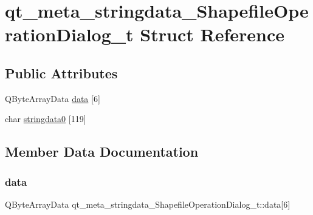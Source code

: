\hypertarget{structqt__meta__stringdata___shapefile_operation_dialog__t}{}\section{qt\+\_\+meta\+\_\+stringdata\+\_\+\+Shapefile\+Operation\+Dialog\+\_\+t Struct Reference}
\label{structqt__meta__stringdata___shapefile_operation_dialog__t}
\subsection*{Public Attributes}
\begin{DoxyCompactItemize}
\item 
Q\+Byte\+Array\+Data \mbox{\hyperlink{structqt__meta__stringdata___shapefile_operation_dialog__t_ac8173565c23693b6429f5c291fefda54}{data}} \mbox{[}6\mbox{]}
\item 
char \mbox{\hyperlink{structqt__meta__stringdata___shapefile_operation_dialog__t_abb1f03a55c445f751118658ec7898856}{stringdata0}} \mbox{[}119\mbox{]}
\end{DoxyCompactItemize}


\subsection{Member Data Documentation}
\mbox{\label{structqt__meta__stringdata___shapefile_operation_dialog__t_ac8173565c23693b6429f5c291fefda54}} 
\subsubsection{\texorpdfstring{data}{data}}
{\footnotesize\ttfamily Q\+Byte\+Array\+Data qt\+\_\+meta\+\_\+stringdata\+\_\+\+Shapefile\+Operation\+Dialog\+\_\+t\+::data\mbox{[}6\mbox{]}}

\mbox{\label{structqt__meta__stringdata___shapefile_operation_dialog__t_abb1f03a55c445f751118658ec7898856}} 
